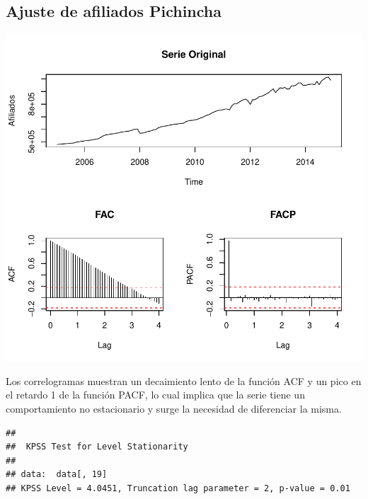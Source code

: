 \documentclass[11pt,a4paper,oneside]{article}\usepackage[]{graphicx}\usepackage[]{color}
\makeatletter
\def\maxwidth{ %
  \ifdim\Gin@nat@width>\linewidth
    \linewidth
  \else
    \Gin@nat@width
  \fi
}
\newenvironment{kframe}{%
 \def\at@end@of@kframe{}%
 \ifinner\ifhmode%
  \def\at@end@of@kframe{\end{minipage}}%
  \begin{minipage}{\columnwidth}%
 \fi\fi%
 \def\FrameCommand##1{\hskip\@totalleftmargin \hskip-\fboxsep
 \colorbox{shadecolor}{##1}\hskip-\fboxsep
     \hskip-\linewidth \hskip-\@totalleftmargin \hskip\columnwidth}%
 \MakeFramed {\advance\hsize-\width
   \@totalleftmargin\z@ \linewidth\hsize
   \@setminipage}}%
 {\par\unskip\endMakeFramed%
 \at@end@of@kframe}
\newenvironment{knitrout}{}{} %
\makeatother
\begin{document}
\subsection{Ajuste de afiliados Pichincha}

\begin{knitrout}
\color{fgcolor}

{\centering \includegraphics[width=\maxwidth]{figure/unnamed-chunk-9-1} 

}



\end{knitrout}

Los correlogramas muestran un decaimiento lento de la función ACF y un pico en el retardo 1 de la función PACF, lo cual implica que la serie tiene un comportamiento no estacionario y surge la necesidad de diferenciar la misma.

\begin{knitrout}
\color{fgcolor}\begin{kframe}
\begin{verbatim}
## 
## 	KPSS Test for Level Stationarity
## 
## data:  data[, 19]
## KPSS Level = 4.0451, Truncation lag parameter = 2, p-value = 0.01
\end{verbatim}
\end{kframe}
\end{knitrout}
\end{document}
